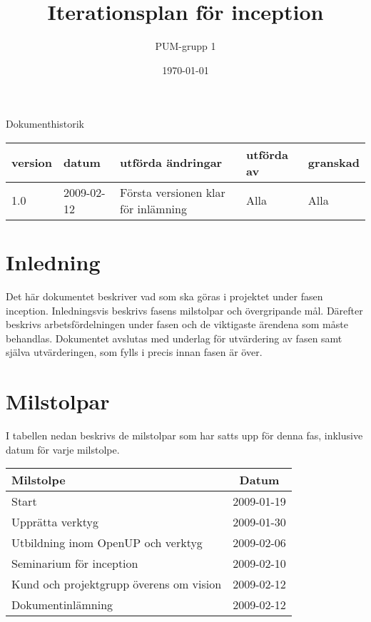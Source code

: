 

\ifpdf
\else
\fi

\title{Iterationsplan för inception}
\author{PUM-grupp 1}
\date{\today}



\maketitle\thispagestyle{empty}
\newpage

{\centering \Large{Dokumenthistorik\\}}

\vspace{10pt}
\begin{tabularx}{\textwidth}{ |l|l|X|l|l| }
  \hline
    \textbf{version} & \textbf{datum} & \textbf{utförda ändringar} & \textbf{utförda av} & \textbf{granskad} \\
	\hline 
  1.0 & 2009-02-12 &  Första versionen klar för inlämning  & Alla & Alla   \\
  \hline
\end{tabularx}

\newpage

\setcounter{tocdepth}{2}
\tableofcontents
\newpage

\section{Inledning}
Det här dokumentet beskriver vad som ska göras i projektet under fasen inception. Inledningsvis beskrivs fasens milstolpar och övergripande mål. Därefter beskrivs arbetsfördelningen under fasen och de viktigaste ärendena som måste behandlas. Dokumentet avslutas med underlag för utvärdering av fasen samt själva utvärderingen, som fylls i precis innan fasen är över.

\section{Milstolpar}
I tabellen nedan beskrivs de milstolpar som har satts upp för denna fas, inklusive datum för varje milstolpe.

\begin{center}
	\begin{tabular}{| l | c |}
	\hline \textbf{Milstolpe} & \textbf{Datum} \\
	\hline Start & 2009-01-19 \\
	\hline Upprätta verktyg & 2009-01-30 \\
	\hline Utbildning inom OpenUP och verktyg & 2009-02-06 \\
	\hline Seminarium för inception & 2009-02-10 \\
	\hline Kund och projektgrupp överens om vision & 2009-02-12 \\
	\hline Dokumentinlämning & 2009-02-12 \\
	\hline
	\end{tabular}
\end{center}

